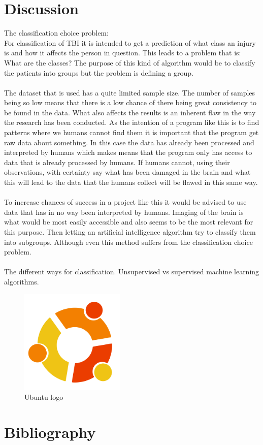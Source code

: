 \documentclass[11pt]{article}
\begin{document}

\section{Discussion}
The classification choice problem:\\
For classification of TBI it is intended to get a prediction of what class an injury is and how it affects the person in question. This leads to a problem that is: What are the classes? The purpose of this kind of algorithm would be to classify the patients into groups but the problem is defining a group.\\
\\
The dataset that is used has a quite limited sample size. The number of samples being so low means that there is a low chance of there being great consistency to be found in the data. What also affects the results is an inherent flaw in the way the research has been conducted. As the intention of a program like this is to find patterns where we humans cannot find them it is important that the program get raw data about something. In this case the data has already been processed and interpreted by humans which makes means that the program only has access to data that is already processed by humans. If humans cannot, using their observations, with certainty say what has been damaged in the brain and what this will lead to the data that the humans collect will be flawed in this same way.\\
\\
To increase chances of success in a project like this it would be advised to use data that has in no way been interpreted by humans. Imaging of the brain is what would be most easily accessible and also seems to be the most relevant for this purpose. Then letting an artificial intelligence algorithm try to classify them into subgroups. Although even this method suffers from the classification choice problem.\\
\\
The different ways for classification. Unsupervised vs supervised machine learning algorithms.

\begin{figure}[ht]
  \centering
  \includegraphics[width=5cm]{graphics/ubuntu.png}
  \caption{Ubuntu logo}
\end{figure}

\section{Bibliography}

\printbibliography
\end{document}
